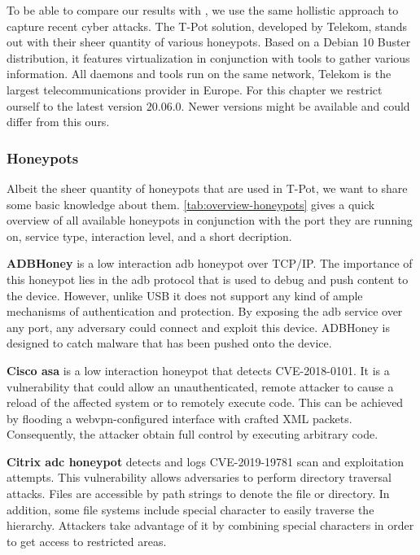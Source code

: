 To be able to compare our results with \citet{Kelly2021}, we use the same hollistic approach to capture recent cyber attacks.
The T-Pot solution, developed by Telekom, stands out with their sheer quantity of various honeypots.
Based on a Debian 10 Buster distribution, it features virtualization in conjunction with tools to gather various information.
All daemons and tools run on the same network, 
Telekom is the largest telecommunications provider in Europe.
For this chapter we restrict ourself to the latest version $20.06.0$.
Newer versions might be available and could differ from this ours.

\subsubsection{Honeypots}

Albeit the sheer quantity of honeypots that are used in T-Pot, we want to share some basic knowledge about them. \autoref{tab:overview-honeypots} gives a quick overview of all available honeypots in conjunction with the port they are running on, service type, interaction level, and a short decription.

\textbf{ADBHoney} \cite{adbhoney2021} is a low interaction \ac{adb} honeypot over TCP/IP.
The importance of this honeypot lies in the \ac{adb} protocol that is used to debug and push content to the device.
However, unlike USB it does not support any kind of ample mechanisms of authentication and protection.
By exposing the \ac{adb} service over any port, any adversary could connect and exploit this device.
ADBHoney is designed to catch malware that has been pushed onto the device.

\textbf{Cisco \ac{asa}} \cite{cymmetria2018} is a low interaction honeypot that detects CVE-2018-0101\cite{CVE-2018-0101}.
It is a vulnerability that could allow an unauthenticated, remote attacker to cause a reload of the affected system or to remotely execute code.
This can be achieved by flooding a webvpn-configured interface with crafted XML packets.
Consequently, the attacker obtain full control by executing arbitrary code.

\textbf{Citrix \ac{adc} honeypot} \cite{citrixhoneypot2020} detects and logs CVE-2019-19781\cite{CVE-2019-19781} scan and exploitation attempts.
This vulnerability allows adversaries to perform directory traversal attacks.
Files are accessible by path strings to denote the file or directory.
In addition, some file systems include special character to easily traverse the hierarchy.
Attackers take advantage of it by combining special characters in order to get access to restricted areas. \cite{flanders2019}

